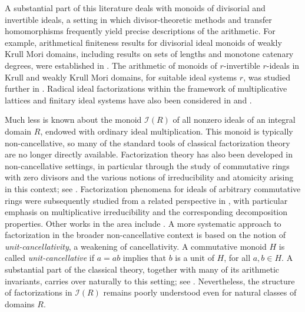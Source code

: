 \documentclass[a4paper,10pt,reqno]{amsart}
\theoremstyle{definition}
\theoremstyle{definition}
\begin{document}
A substantial part of this literature deals with monoids of divisorial and invertible ideals, a setting in which divisor-theoretic methods and transfer homomorphisms frequently yield precise descriptions of the arithmetic. For example, arithmetical finiteness results for divisorial ideal monoids of weakly Krull Mori domains, including results on sets of lengths and monotone catenary degrees, were established in
\cite{Ge-Re19}. The arithmetic of monoids of $r$-invertible $r$-ideals in Krull and weakly Krull Mori domains, for suitable ideal systems $r$, was studied further in \cite{Ge-Kh22}. Radical ideal factorizations within the framework of multiplicative lattices and finitary ideal systems have also been
considered in \cite{Ol-Re19} and \cite{Ol-Re20}.

Much less is known about the monoid $\mathcal I(R)$ of all nonzero ideals of an integral domain $R$, endowed with ordinary ideal multiplication. This monoid is typically non-cancellative, so many of the standard tools of classical factorization theory are no longer directly available. Factorization theory has also been developed in non-cancellative settings, in particular through the study of commutative rings with zero divisors and the various notions of irreducibility and atomicity arising in this context; see \cite{AnVL96,AnVL97}. Factorization phenomena for ideals of arbitrary commutative rings were subsequently studied from a related perspective in \cite{An-Ju-Mo19}, with particular emphasis on multiplicative irreducibility and the corresponding decomposition properties. Other works in the area include \cite{Jue13, GJNR24}. A more systematic approach to factorization in the broader non-cancellative context is based on the notion of {\it unit-cancellativity}, a weakening of cancellativity. A commutative monoid $H$ is called {\it unit-cancellative} if $a=ab$ implies that $b$ is a unit of $H$, for all $a,b\in H$. A substantial part of the classical theory, together with many of its arithmetic invariants, carries over naturally to this setting; see \cite{Fan17,Ge-Zh20}. Nevertheless, the structure of factorizations in $\mathcal I(R)$ remains poorly understood even for natural classes of domains $R$.
\end{document}
